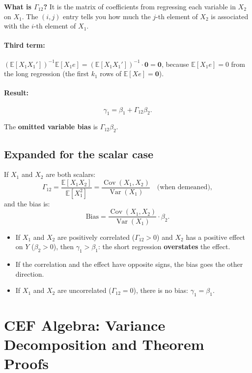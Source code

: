 \documentclass[12pt]{article}
\newcommand{\E}{\mathbb{E}}
\newcommand{\Var}{\operatorname{Var}}
\newcommand{\Cov}{\operatorname{Cov}}
\theoremstyle{definition}
\begin{document}
\textbf{What is $\Gamma_{12}$?}  It is the matrix of coefficients from regressing each variable in $X_2$ on $X_1$. The $(i,j)$ entry tells you how much the $j$-th element of $X_2$ is associated with the $i$-th element of $X_1$.

\paragraph{Third term:}
$(\E[X_1 X_1'])^{-1}\E[X_1 e] = (\E[X_1 X_1'])^{-1}\cdot \mathbf{0} = \mathbf{0}$, because $\E[X_1 e] = 0$ from the long regression (the first $k_1$ rows of $\E[Xe] = \mathbf{0}$).

\paragraph{Result:}
\begin{equation}
\boxed{\gamma_1 = \beta_1 + \Gamma_{12}\beta_2.}
\end{equation}

The \textbf{omitted variable bias} is $\Gamma_{12}\beta_2$.

\subsection{Expanded for the scalar case}

If $X_1$ and $X_2$ are both scalars:
\[
\Gamma_{12} = \frac{\E[X_1 X_2]}{\E[X_1^2]} = \frac{\Cov(X_1, X_2)}{\Var(X_1)} \quad \text{(when demeaned)},
\]
and the bias is:
\[
\text{Bias} = \frac{\Cov(X_1, X_2)}{\Var(X_1)} \cdot \beta_2.
\]

\begin{itemize}
\item If $X_1$ and $X_2$ are positively correlated ($\Gamma_{12} > 0$) and $X_2$ has a positive effect on $Y$ ($\beta_2 > 0$), then $\gamma_1 > \beta_1$: the short regression \textbf{overstates} the effect.
\item If the correlation and the effect have opposite signs, the bias goes the other direction.
\item If $X_1$ and $X_2$ are uncorrelated ($\Gamma_{12} = 0$), there is no bias: $\gamma_1 = \beta_1$.
\end{itemize}


\section{CEF Algebra: Variance Decomposition and Theorem Proofs}
\label{sec:cef}
\end{document}
